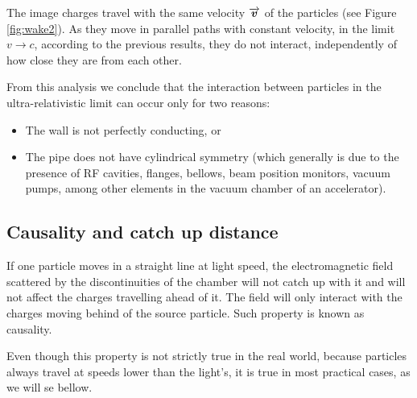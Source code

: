 The image charges travel with the same velocity $\overrightarrow{\boldsymbol{v}}$ of the particles (see Figure\,\ref{fig:wake2}). As they move in parallel paths with constant velocity, in the limit $v \to c$, according to the previous results, they do not interact, independently of how close they are from each other.

From this analysis we conclude that the interaction between particles in the ultra-relativistic limit can occur only for two reasons:
\begin{itemize}
    \item The wall is not perfectly conducting, or
    \item The pipe does not have cylindrical symmetry (which generally is due to the presence of RF cavities, flanges, bellows, beam position monitors, vacuum pumps, among other elements in the vacuum chamber of an accelerator).
\end{itemize}

\subsection{Causality and catch up distance}

If one particle moves in a straight line at light speed, the electromagnetic field scattered by the discontinuities of the chamber will not catch up with it and will not affect the charges travelling ahead of it. The field will only interact with the charges moving behind of the source particle. Such property is known as causality.

Even though this property is not strictly true in the real world, because particles always travel at speeds lower than the light's, it is true in most practical cases, as we will se bellow.

